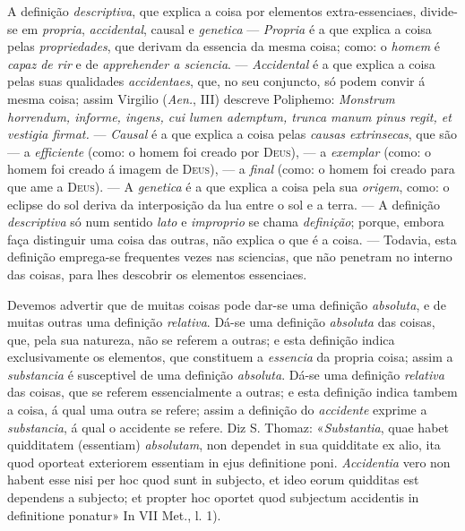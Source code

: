 A definição \emph{descriptiva}, que explica a coisa por elementos extra-essenciaes, divide-se em \emph{propria}, \emph{accidental}, causal e \emph{genetica} --- \emph{Propria} é a que explica a coisa pelas \emph{propriedades}, que derivam da essencia da mesma coisa; como: o \emph{homem} é \emph{capaz de rir} e de \emph{apprehender a sciencia}. --- \emph{Accidental} é a que explica a coisa pelas suas qualidades \emph{accidentaes}, que, no seu conjuncto, só podem convir á mesma coisa; assim Virgilio (\emph{Aen.}, III) descreve Poliphemo: \emph{Monstrum horrendum, informe, ingens, cui lumen ademptum, trunca manum pinus regit, et vestigia firmat.} --- \emph{Causal} é a que explica a coisa pelas \emph{causas extrinsecas}, que são --- a \emph{efficiente} (como: o homem foi creado por \textsc{Deus}), --- a \emph{exemplar} (como: o homem foi creado á imagem de \textsc{Deus}), --- a \emph{final} (como: o homem foi creado para que ame a \textsc{Deus}). --- A \emph{genetica} é a que explica a coisa pela sua \emph{origem}, como: o eclipse do sol deriva da interposição da lua entre o sol e a terra. --- A definição \emph{descriptiva} só num sentido \emph{lato} e \emph{improprio} se chama \emph{definição}; porque, embora faça distinguir uma coisa das outras, não explica o que é a coisa. --- Todavia, esta definição emprega-se frequentes vezes nas sciencias, que não penetram no interno das coisas, para lhes descobrir os elementos essenciaes.

Devemos advertir que de muitas coisas pode dar-se uma definição \emph{absoluta}, e de muitas outras uma definição \emph{relativa}. Dá-se uma definição \emph{absoluta} das coisas, que, pela sua natureza, não se referem a outras; e esta definição indica exclusivamente os elementos, que constituem a \emph{essencia} da propria coisa; assim a \emph{substancia} é susceptivel de uma definição \emph{absoluta}. Dá-se uma definição \emph{relativa} das coisas, que se referem essencialmente a outras; e esta definição indica tambem a coisa, á qual uma outra se refere; assim a definição do \emph{accidente} exprime a \emph{substancia}, á qual o accidente se refere. Diz S. Thomaz: «\emph{Substantia}, quae habet quidditatem (essentiam) \emph{absolutam}, non dependet in sua quidditate ex alio, ita quod oporteat exteriorem essentiam in ejus definitione poni. \emph{Accidentia} vero non habent esse nisi per hoc quod sunt in subjecto, et ideo eorum quidditas est dependens a subjecto; et propter hoc oportet quod subjectum accidentis in definitione ponatur» In VII Met., l. 1).

